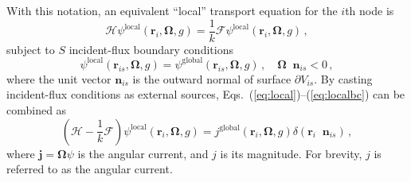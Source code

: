\documentclass[5p,times,twocolumn,10pt]{elsarticle}
\newcommand{\oper}[1]{\mathcal{#1}}
\newcommand{\EQS}[2]{Eqs.~(\ref{#1})--(\ref{#2})}
\DeclareMathOperator*{\dotp}{{\scriptscriptstyle \stackrel{\bullet}{{}}}}
\begin{document}
    With this notation, an equivalent ``local'' transport equation for the
    $i$th node is
    \begin{equation}
        \oper{H}\psi^{\mathrm{local}}(\mathbf{r}_i,\bm{\Omega},g) =
        \frac{1}{k} \oper{F} \psi^{\mathrm{local}}(\mathbf{r}_i,\bm{\Omega},g)
        \, ,
        \label{eq:local}
    \end{equation}
    subject to  $S$  incident-flux boundary conditions
    \begin{equation}
        \psi^{\mathrm{local}}(\mathbf{r}_{is}, \bm{\Omega}, g) =
        \psi^{\mathrm{global}}(\mathbf{r}_{is},\bm{\Omega}, g) \, ,
        \quad \bm{\Omega} \dotp \mathbf{n}_{is} < 0 \, ,
        \label{eq:localbc}
    \end{equation}
    where the unit vector $\mathbf{n}_{is}$ is the outward normal of surface
    $\partial V_{is}$. By casting incident-flux conditions as external
    sources, \EQS{eq:local}{eq:localbc} can be combined as
    \begin{equation}
        \left ( \oper{H} - \frac{1}{k} \oper{F} \right
        )\psi^{\mathrm{local}}(\mathbf{r}_i,\bm{\Omega},g) =
        j^{\mathrm{global}}(\mathbf{r}_i, \bm{\Omega},g)
        \delta(\mathbf{r}_i \dotp \mathbf{n}_{is}) \, ,
        \label{eq:localcombined}
    \end{equation}
    where $\mathbf{j} = \bm{\Omega} \psi$ is the angular current, and $j$ is
its
    magnitude.  For brevity, $j$ is referred to as the angular current.
\end{document}
